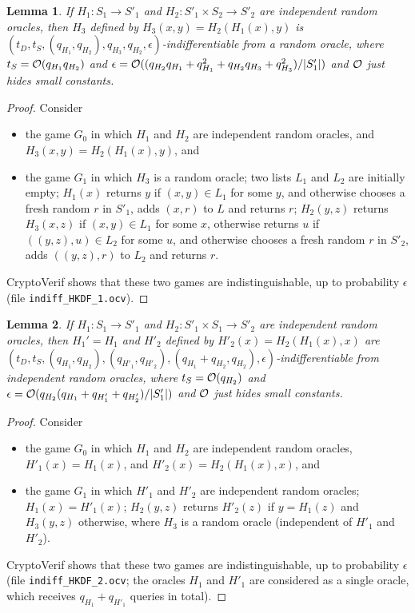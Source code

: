\documentclass[compsoc, conference, letterpaper, 10pt, times]{IEEEtran}
\newtheorem{lemma}{Lemma}
\begin{document}
\begin{lemma}\label{lem:hcomp1}
If $H_1 : S_1 \rightarrow S'_1$ and $H_2 : S'_1 \times S_2 \rightarrow S'_2$ 
are independent random oracles, then $H_3$ defined by $H_3(x,y) = H_2(H_1(x),y)$
is $(t_D, t_S, (q_{H_1}, q_{H_2}), q_{H_3}, q_{H_2}, \epsilon)$-indifferentiable from a random oracle, where $t_S = {\cal O}(q_{H_1} q_{H_2})$ and $\epsilon = {\cal O}((q_{H_2}q_{H_1} + q_{H_1}^2 + q_{H_2}q_{H_3} + q_{H_3}^2)/|S'_1|)$ and ${\cal O}$ just hides small constants.
\end{lemma}
\begin{proof}
Consider
\begin{itemize}[leftmargin=*]
\item  the game $G_0$ in which $H_1$ and $H_2$ are independent random oracles,
  and $H_3(x,y) = H_2(H_1(x),y)$, and
\item the game $G_1$ in which 
  $H_3$ is a random oracle;
  two lists $L_1$ and $L_2$ are initially empty;
  $H_1(x)$ returns $y$ if $(x,y) \in L_1$ for some $y$, 
  and otherwise chooses a fresh random $r$ in $S'_1$,
  adds $(x,r)$ to $L$ and returns $r$;
  $H_2(y,z)$ returns $H_3(x,z)$ if $(x,y) \in L_1$ for some $x$,
  otherwise returns $u$ if $((y,z),u) \in L_2$ for some $u$,
  and otherwise chooses a fresh random $r$ in $S'_2$,
  adds $((y,z),r)$ to $L_2$ and returns $r$.
\end{itemize}
CryptoVerif shows that these two games are indistinguishable,
up to probability $\epsilon$ (file \texttt{indiff\_HKDF\_1.ocv}).
\end{proof}

\begin{lemma}\label{lem:hcomp2}
If $H_1 : S_1 \rightarrow S'_1$ and $H_2 : S'_1 \times S_1 \rightarrow S'_2$ 
are independent random oracles, then $H_1' = H_1$ and $H'_2$ defined by 
$H'_2(x) = H_2(H_1(x),x)$ are $(t_D, t_S, (q_{H_1}, q_{H_2}), (q_{H'_1}, q_{H'_2}), (q_{H_1} + q_{H_2}, q_{H_2}), \epsilon)$-indifferentiable from independent random oracles, where $t_S = {\cal O}(q_{H_2})$ and $\epsilon = {\cal O}(q_{H_2}(q_{H_1}+q_{H'_1} + q_{H'_2})/|S'_1|)$ and ${\cal O}$ just hides small constants.
\end{lemma}
\begin{proof}
Consider
\begin{itemize}[leftmargin=*]
\item  the game $G_0$ in which $H_1$ and $H_2$ are independent random oracles,
  $H'_1(x) = H_1(x)$, and $H'_2(x) = H_2(H_1(x),x)$, and
\item the game $G_1$ in which 
  $H'_1$ and $H'_2$ are independent random oracles;
  $H_1(x) = H'_1(x)$;
  $H_2(y,z)$ returns $H'_2(z)$ if $y = H_1(z)$ and $H_3(y,z)$ otherwise,
  where $H_3$ is a random oracle (independent of $H'_1$ and $H'_2$).
\end{itemize}
CryptoVerif shows that these two games are indistinguishable,
up to probability $\epsilon$ (file \texttt{indiff\_HKDF\_2.ocv};
the oracles $H_1$ and $H'_1$ are considered as a single oracle,
which receives $q_{H_1}+q_{H'_1}$ queries in total).
\end{proof}
\end{document}
